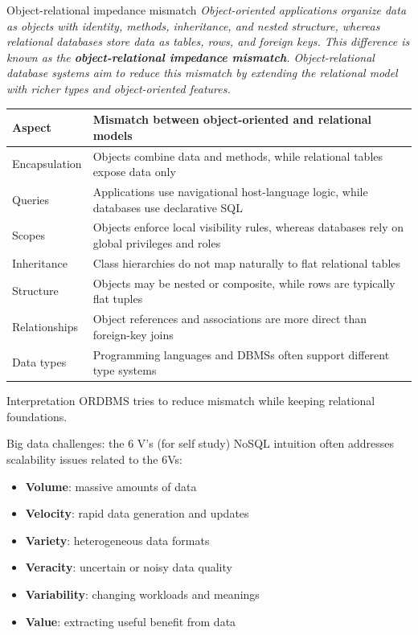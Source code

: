 \documentclass[10pt,aspectratio=169]{beamer}
\newenvironment{examplebox}[1][Example]{\begin{exampleblock}{#1}}{\end{exampleblock}}
\begin{document}
\begin{frame}{Object-relational impedance mismatch}
\scriptsize
\textit{Object-oriented applications organize data as objects with identity, methods, inheritance, and nested structure, whereas relational databases store data as tables, rows, and foreign keys. This difference is known as the \textbf{object-relational impedance mismatch}. Object-relational database systems aim to reduce this mismatch by extending the relational model with richer types and object-oriented features.}

\vspace{0.4em}

\begin{tabular}{@{}p{2.7cm}p{10.8cm}@{}}
\toprule
\textbf{Aspect} & \textbf{Mismatch between object-oriented and relational models} \\
\midrule
Encapsulation & Objects combine data and methods, while relational tables expose data only \\
Queries & Applications use navigational host-language logic, while databases use declarative SQL \\
Scopes & Objects enforce local visibility rules, whereas databases rely on global privileges and roles \\
Inheritance & Class hierarchies do not map naturally to flat relational tables \\
Structure & Objects may be nested or composite, while rows are typically flat tuples \\
Relationships & Object references and associations are more direct than foreign-key joins \\
Data types & Programming languages and DBMSs often support different type systems \\
\bottomrule
\end{tabular}
\begin{examplebox}[Interpretation]
ORDBMS tries to reduce mismatch while keeping relational foundations.
\end{examplebox}
\end{frame}




\begin{frame}{Big data challenges: the 6 V's (for self study)}
\small
NoSQL intuition often addresses scalability issues related to the 6Vs:
\begin{itemize}
  \item \textbf{Volume}: massive amounts of data
  \item \textbf{Velocity}: rapid data generation and updates
  \item \textbf{Variety}: heterogeneous data formats
  \item \textbf{Veracity}: uncertain or noisy data quality
  \item \textbf{Variability}: changing workloads and meanings
  \item \textbf{Value}: extracting useful benefit from data
\end{itemize}
\end{frame}
\end{document}

